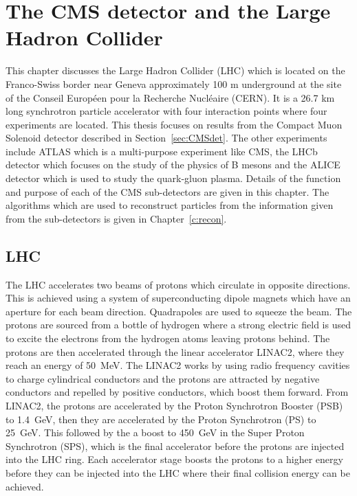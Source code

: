\chapter{The CMS detector and the Large Hadron Collider}
\label{c:det}
This chapter discusses the Large Hadron Collider (LHC) which is located on the Franco-Swiss border near Geneva approximately 100 m underground at the site of the Conseil Europ\'{e}en pour la Recherche Nucl\'{e}aire (CERN). It is a 26.7 km long synchrotron particle accelerator with four interaction points where four experiments are located. This thesis focuses on results from the Compact Muon Solenoid detector described in Section~\ref{sec:CMSdet}. The other experiments include ATLAS which is a multi-purpose experiment like CMS, the LHCb detector which focuses on the study of the physics of B mesons and the ALICE detector which is used to study the quark-gluon plasma. Details of the function and purpose of each of the CMS sub-detectors are given in this chapter. The algorithms which are used to reconstruct particles from the information given from the sub-detectors is given in Chapter~\ref{c:recon}.

\section{LHC}

The LHC accelerates two beams of protons which circulate in opposite directions.
This is achieved using a system of superconducting dipole magnets which have an aperture for each beam direction. Quadrapoles are used to squeeze the beam.
The protons are sourced from a bottle of hydrogen where a strong electric field is used to excite the electrons from the hydrogen atoms leaving protons behind. The protons are then accelerated through the linear accelerator LINAC2, where they reach an energy of 50~MeV. The LINAC2 works by using radio frequency cavities to charge cylindrical conductors and the protons are attracted by negative conductors and repelled by positive conductors, which boost them forward. From LINAC2, the protons are accelerated by the Proton Synchrotron Booster (PSB) to 1.4~GeV, then they are accelerated by the Proton Synchrotron (PS) to 25~GeV. This followed by the a boost to 450~GeV in the Super Proton Synchrotron (SPS), which is the final accelerator before the protons are injected into the LHC ring. Each accelerator stage boosts the protons to a higher energy before they can be injected into the LHC where their final collision energy can be achieved.


